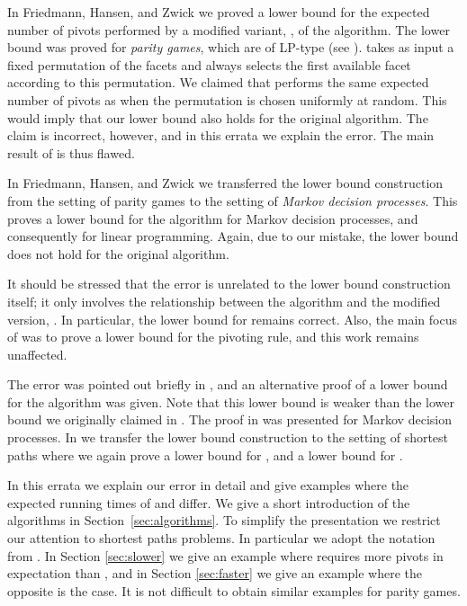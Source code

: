 \documentclass[twoside,11pt]{article}
\begin{document}
In Friedmann, Hansen, and Zwick \cite{FriedmannHansenZwick/SODA11} we proved a  lower bound for the expected number of pivots performed by a modified variant, , of the  algorithm. The lower bound was proved for \emph{parity games}, which are of LP-type (see \cite{Halman07}).  takes as input a fixed permutation of the facets and always selects the first available facet according to this permutation. We claimed that  performs the same expected number of pivots as  when the permutation is chosen uniformly at random. This would imply that our lower bound also holds for the original  algorithm. The claim is incorrect, however, and in this errata we explain the error. The main result of \cite{FriedmannHansenZwick/SODA11} is thus flawed.

In Friedmann, Hansen, and Zwick \cite{FriedmannHansenZwick/STOC11} we transferred the lower bound construction from the setting of parity games to the setting of \emph{Markov decision processes}. This proves a lower bound for the  algorithm for Markov decision processes, and consequently for linear programming. Again, due to our mistake, the lower bound does not hold for the original  algorithm.

It should be stressed that the error is unrelated to the lower bound construction itself; it only involves the relationship between the  algorithm and the modified version, . In particular, the lower bound for  remains correct. Also, the main focus of \cite{FriedmannHansenZwick/STOC11} was to prove a lower bound for the  pivoting rule, and this work remains unaffected.

The error was pointed out briefly in \cite{Hansen12}, and an alternative proof of a  lower bound for the  algorithm was given. Note that this lower bound is weaker than the  lower bound we originally claimed in \cite{FriedmannHansenZwick/SODA11,FriedmannHansenZwick/STOC11}. The proof in \cite{Hansen12} was presented for Markov decision processes. In \cite{FriedmannHansenZwick/2014} we transfer the lower bound construction to the setting of shortest paths where we again prove a  lower bound for , and a  lower bound for .

In this errata we explain our error in detail and give examples where the expected running times of  and  differ. We give a short introduction of the algorithms in Section~\ref{sec:algorithms}. To simplify the presentation we restrict our attention to shortest paths problems. In particular we adopt the notation from \cite{FriedmannHansenZwick/2014}. In Section \ref{sec:slower} we give an example where  requires more pivots in expectation than , and in Section \ref{sec:faster} we give an example where the opposite is the case. It is not difficult to obtain similar examples for parity games.
\end{document}
